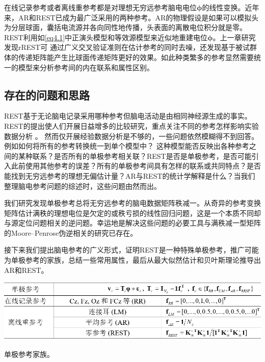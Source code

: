 在线记录参考或者离线重参考都是对理想无穷远参考脑电电位$\mathbf{\phi}$的线性变换。近年来，AR和REST已成为最广泛采用的两种参考。AR的物理假设是如果可以模拟头为分层球面，囊括电流源并各向同性地传播，头表面的离散电位积分就是零。 REST利用如\eqref{eq4.1}中正演头模型和等效源模型来近似地重建电位$\mathbf{\phi}$。上一章研究发现rREST可
通过广义交叉验证准则在估计参考的同时去噪，还发现基于被试群体的传递矩阵能产生比球面传递矩阵更好的效果。如此种类繁多的参考显然需要统一的模型来分析参考间的内在联系和属性区别。

\subsection{存在的问题和思路}
REST基于无论脑电记录采用哪种参考但脑电活动是由相同神经源生成的事实。REST的提出使人们开展日益增多的比较研究，重点关注不同的参考怎样影响实验数据分析 。 然而仅开展经验数据分析是不够的，一些问题依然模糊得不到回答。例如如何将所有的参考转换统一到单个模型中？
这种模型能否反映出各种参考之间的某种联系？是否所有的单极参考相关联？REST是否是单极参考，是否可能引入此前使用其他参考的误差？所有的单极参考间具有怎样的联系或共同特点？是否能找到无穷远参考的理想无偏估计量？AR与REST的统计学解释是什么？当我们整理脑电参考问题的综述时，这些问题由然而出。

我们研究发现单极参考总将无穷远参考的脑电数据矩阵秩减一。从奇异的参考变换矩阵估计满秩的理想电位是欠定的或秩亏损的线性回归问题，这是一个本质不同却与源定位问题相关的逆问题。幸运地是解决这些问题的必要工具与满秩减一型矩阵的Moore–Penrose伪逆相关的研究已存在。

接下来我们提出脑电参考的广义形式，证明REST是一种特殊单极参考，推广可能为单极参考的家族，总结一些常用属性，最后从最大似然估计和贝叶斯理论推导出AR和REST。

\begin{table}[!h]
  \includegraphics[width=\linewidth]{pic/ref3/table.png}
  \caption{单极参考家族。}
  \label{tab}
\end{table}

